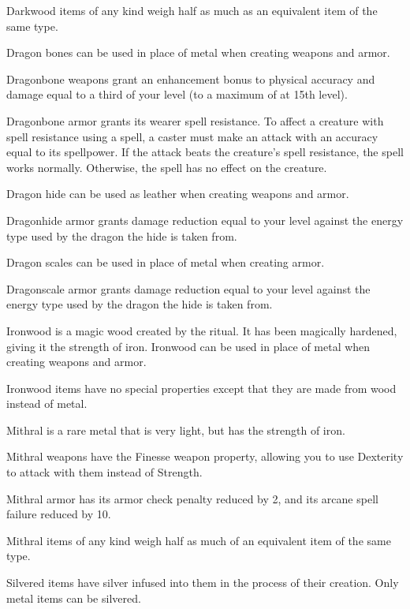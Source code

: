 Darkwood items of any kind weigh half as much as an equivalent item of the same type.


Dragon bones can be used in place of metal when creating weapons and armor.

Dragonbone weapons grant an enhancement bonus to physical accuracy and damage equal to a third of your level (to a maximum of  at 15th level).

Dragonbone armor grants its wearer spell resistance.
To affect a creature with spell resistance using a spell, a caster must make an attack with an accuracy equal to its spellpower.
If the attack beats the creature's spell resistance, the spell works normally.
Otherwise, the spell has no effect on the creature.


Dragon hide can be used as leather when creating weapons and armor.

Dragonhide armor grants damage reduction equal to your level against the energy type used by the dragon the hide is taken from.


Dragon scales can be used in place of metal when creating armor.

Dragonscale armor grants damage reduction equal to your level against the energy type used by the dragon the hide is taken from.

Ironwood is a magic wood created by the  ritual.
It has been magically hardened, giving it the strength of iron.
Ironwood can be used in place of metal when creating weapons and armor.

Ironwood items have no special properties except that they are made from wood instead of metal.

Mithral is a rare metal that is very light, but has the strength of iron.

Mithral weapons have the Finesse weapon property, allowing you to use Dexterity to attack with them instead of Strength.

Mithral armor has its armor check penalty reduced by 2, and its arcane spell failure reduced by 10.

Mithral items of any kind weigh half as much of an equivalent item of the same type.


Silvered items have silver infused into them in the process of their creation.
Only metal items can be silvered.

